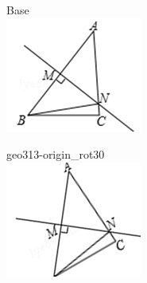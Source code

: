 \documentclass[12pt]{article}
\begin{document}
\begin{center}
\begin{minipage}{0.32\textwidth}\centering
Base\\
\includegraphics[width=0.95\linewidth]{out_rommath_origin/items/geo313-origin/assets/figure.png}
\end{minipage}
\hfill\begin{minipage}{0.32\textwidth}\centering
geo313-origin\_rot30\\
\includegraphics[width=0.95\linewidth]{out_rommath_origin/items/geo313-origin/assets/figure_rot30.png}
\end{minipage}

\end{center}
\end{document}
